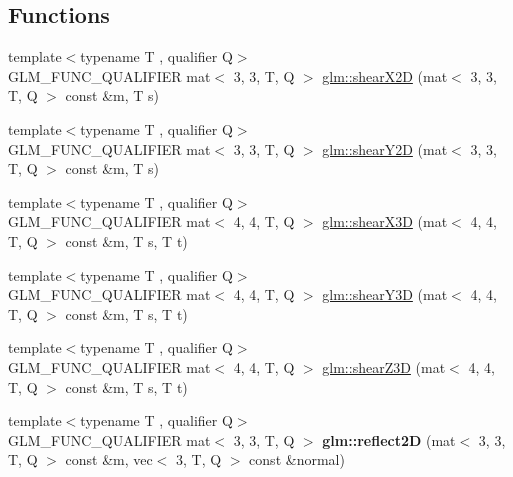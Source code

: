 \subsection*{Functions}
\begin{DoxyCompactItemize}
\item 
{\footnotesize template$<$typename T , qualifier Q$>$ }\\G\+L\+M\+\_\+\+F\+U\+N\+C\+\_\+\+Q\+U\+A\+L\+I\+F\+I\+ER mat$<$ 3, 3, T, Q $>$ \hyperlink{group__gtx__transform2_gabf714b8a358181572b32a45555f71948}{glm\+::shear\+X2D} (mat$<$ 3, 3, T, Q $>$ const \&m, T s)
\item 
{\footnotesize template$<$typename T , qualifier Q$>$ }\\G\+L\+M\+\_\+\+F\+U\+N\+C\+\_\+\+Q\+U\+A\+L\+I\+F\+I\+ER mat$<$ 3, 3, T, Q $>$ \hyperlink{group__gtx__transform2_gac7998d0763d9181550c77e8af09a182c}{glm\+::shear\+Y2D} (mat$<$ 3, 3, T, Q $>$ const \&m, T s)
\item 
{\footnotesize template$<$typename T , qualifier Q$>$ }\\G\+L\+M\+\_\+\+F\+U\+N\+C\+\_\+\+Q\+U\+A\+L\+I\+F\+I\+ER mat$<$ 4, 4, T, Q $>$ \hyperlink{group__gtx__transform2_ga73e867c6cd4d700fe2054437e56106c4}{glm\+::shear\+X3D} (mat$<$ 4, 4, T, Q $>$ const \&m, T s, T t)
\item 
{\footnotesize template$<$typename T , qualifier Q$>$ }\\G\+L\+M\+\_\+\+F\+U\+N\+C\+\_\+\+Q\+U\+A\+L\+I\+F\+I\+ER mat$<$ 4, 4, T, Q $>$ \hyperlink{group__gtx__transform2_gade5bb65ffcb513973db1a1314fb5cfac}{glm\+::shear\+Y3D} (mat$<$ 4, 4, T, Q $>$ const \&m, T s, T t)
\item 
{\footnotesize template$<$typename T , qualifier Q$>$ }\\G\+L\+M\+\_\+\+F\+U\+N\+C\+\_\+\+Q\+U\+A\+L\+I\+F\+I\+ER mat$<$ 4, 4, T, Q $>$ \hyperlink{group__gtx__transform2_ga6591e0a3a9d2c9c0b6577bb4dace0255}{glm\+::shear\+Z3D} (mat$<$ 4, 4, T, Q $>$ const \&m, T s, T t)
\item 
\mbox{\label{transform2_8inl_ac437357f6021e295f9c4470913141014}} 
{\footnotesize template$<$typename T , qualifier Q$>$ }\\G\+L\+M\+\_\+\+F\+U\+N\+C\+\_\+\+Q\+U\+A\+L\+I\+F\+I\+ER mat$<$ 3, 3, T, Q $>$ {\bfseries glm\+::reflect2D} (mat$<$ 3, 3, T, Q $>$ const \&m, vec$<$ 3, T, Q $>$ const \&normal)
\item 
\mbox{\label{transform2_8inl_ad1f2111494429316800124b0d31069dc}} 

\end{DoxyCompactItemize}
